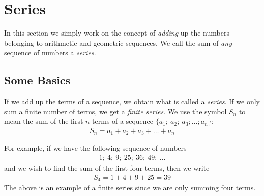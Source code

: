 

\section{Series}
\label{mp:se}
In this section we simply work on the concept of \textit{adding} up the numbers belonging to arithmetic and geometric sequences. We call the sum of \textit{any} sequence of numbers a \textit{series}.

\subsection{Some Basics}
If we add up the terms of a sequence, we obtain what is called a \textit{series}. If we only sum a finite number of terms, we get a \textit{finite series}. We use the symbol $S_n$ to mean the sum of the first $n$ terms of a sequence
$\{a_1; \: a_2; \: a_3; \ldots ; a_n \}$:
\begin{eqnarray}
S_n = a_1 + a_2 + a_3 + \ldots + a_n
\end{eqnarray}

For example, if we have the following sequence of numbers
\begin{eqnarray*}
1; \: 4; \: 9; \: 25; \: 36; \: 49; \: \ldots
\end{eqnarray*}
and we wish to find the sum of the first four terms, then we write
\begin{eqnarray*}
S_4 = 1 + 4 + 9 + 25 = 39
\end{eqnarray*}
The above is an example of a finite series since we are only summing four terms.

